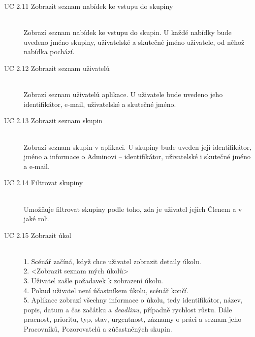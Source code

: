 \documentclass[thesis=B,czech]{FITthesis}[2012/06/26]
\begin{document}
\begin{description}
				\item[UC 2.11 Zobrazit seznam nabídek ke vstupu do skupiny] \hfill \\
					Zobrazí seznam nabídek ke vstupu do skupin. U každé nabídky bude uvedeno jméno skupiny, uživatelské a skutečné jméno uživatele, od něhož nabídka pochází.
				
				\item[UC 2.12 Zobrazit seznam uživatelů] \hfill \\
					Zobrazí seznam uživatelů aplikace. U uživatele bude uvedeno jeho identifikátor, e-mail, uživatelské a skutečné jméno.
					
				\item[UC 2.13 Zobrazit seznam skupin] \hfill \\
					Zobrazí seznam skupin v aplikaci. U skupiny bude uveden její identifikátor, jméno a informace o Adminovi -- identifikátor, uživatelské i skutečné jméno a e-mail.
					
				\item[UC 2.14 Filtrovat skupiny] \hfill \\
					Umožňuje filtrovat skupiny podle toho, zda je uživatel jejich Členem a v jaké roli.
					
				\item[UC 2.15 Zobrazit úkol] \hfill \\
					1. Scénář začíná, když chce uživatel zobrazit detaily úkolu. \\
					2. <Zobrazit seznam mých úkolů> \\
					3. Uživatel zašle požadavek k zobrazení úkolu. \\
					4. Pokud uživatel není účastníkem úkolu, scénář končí.  \\
					5. Aplikace zobrazí všechny informace o úkolu, tedy identifikátor, název, popis, datum a čas začátku a \textit{deadlinu}, případně rychlost růstu. Dále pracnost, prioritu, typ, stav, urgentnost, záznamy o práci a seznam jeho Pracovníků, Pozorovatelů a zúčastněných skupin. \\
					

\end{description}
\end{document}
